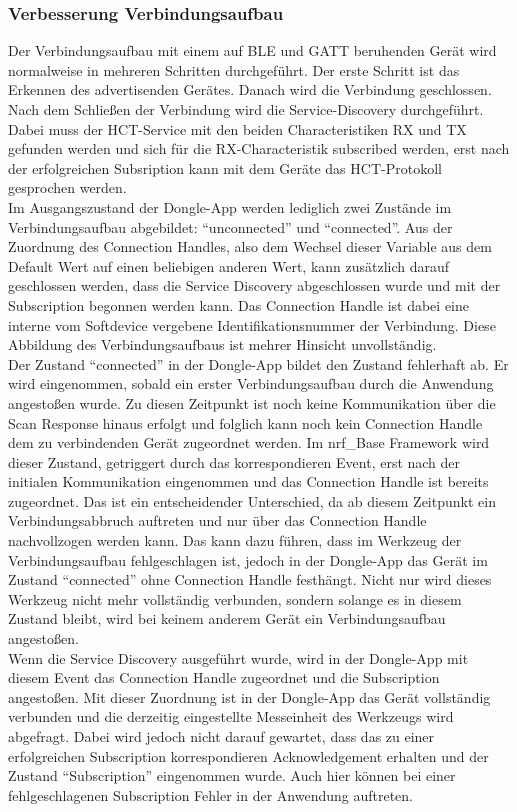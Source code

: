 \subsubsection{Verbesserung Verbindungsaufbau}
Der Verbindungsaufbau mit einem auf \ac{BLE} und \ac{GATT} beruhenden Gerät wird normalweise in mehreren Schritten durchgeführt. Der erste Schritt ist das Erkennen des advertisenden Gerätes. Danach wird die Verbindung geschlossen. Nach dem Schließen der Verbindung wird die Service-Discovery durchgeführt. Dabei muss der \ac{HCT}-Service mit den beiden Characteristiken RX und TX gefunden werden und sich für die RX-Characteristik subscribed werden, erst nach der erfolgreichen Subsription kann mit dem Geräte das HCT-Protokoll gesprochen werden.\\
Im Ausgangszustand der Dongle-App werden lediglich zwei Zustände im Verbindungsaufbau abgebildet: ``unconnected'' und ``connected''. Aus der Zuordnung des Connection Handles, also dem Wechsel dieser Variable aus dem Default Wert auf einen beliebigen anderen Wert, kann zusätzlich darauf geschlossen werden, dass die Service Discovery abgeschlossen wurde und mit der Subscription begonnen werden kann. Das Connection Handle ist dabei eine interne vom Softdevice vergebene Identifikationsnummer der Verbindung. Diese Abbildung des Verbindungsaufbaus ist mehrer Hinsicht unvollständig.\\
Der Zustand ``connected'' in der Dongle-App bildet den Zustand fehlerhaft ab. Er wird eingenommen, sobald ein erster Verbindungsaufbau durch die Anwendung angestoßen wurde. Zu diesen Zeitpunkt ist noch keine Kommunikation über die Scan Response hinaus erfolgt und folglich kann noch kein Connection Handle dem zu verbindenden Gerät zugeordnet werden. Im nrf\_Base Framework wird dieser Zustand, getriggert durch das korrespondieren Event, erst nach der initialen Kommunikation eingenommen und das Connection Handle ist bereits zugeordnet. Das ist ein entscheidender Unterschied, da ab diesem Zeitpunkt ein Verbindungsabbruch auftreten und nur über das Connection Handle nachvollzogen werden kann. Das kann dazu führen, dass im Werkzeug der Verbindungsaufbau fehlgeschlagen ist, jedoch in der Dongle-App das Gerät im Zustand ``connected'' ohne Connection Handle festhängt. Nicht nur wird dieses Werkzeug nicht mehr vollständig verbunden, sondern solange es in diesem Zustand bleibt, wird bei keinem anderem Gerät ein Verbindungsaufbau angestoßen.\\
Wenn die Service Discovery ausgeführt wurde, wird in der Dongle-App mit diesem Event das Connection Handle zugeordnet und die Subscription angestoßen. Mit dieser Zuordnung ist in der Dongle-App das Gerät vollständig verbunden und die derzeitig eingestellte Messeinheit des Werkzeugs wird abgefragt. Dabei wird jedoch nicht darauf gewartet, dass das zu einer erfolgreichen Subscription korrespondieren Acknowledgement erhalten und der Zustand ``Subscription'' eingenommen wurde. Auch hier können bei einer fehlgeschlagenen Subscription Fehler in der Anwendung auftreten.\\

